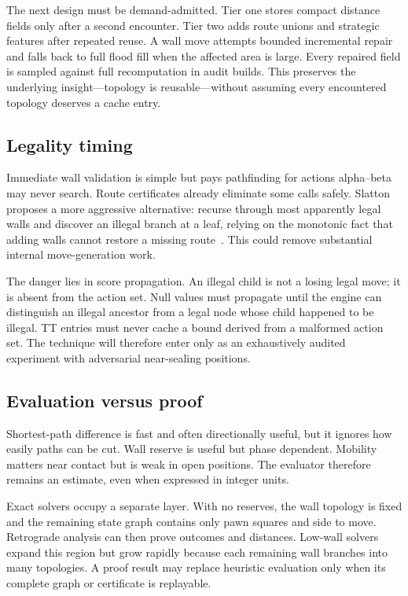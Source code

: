 The next design must be demand-admitted. Tier one stores compact distance fields only after a second encounter. Tier two adds route unions and strategic features after repeated reuse. A wall move attempts bounded incremental repair and falls back to full flood fill when the affected area is large. Every repaired field is sampled against full recomputation in audit builds. This preserves the underlying insight---topology is reusable---without assuming every encountered topology deserves a cache entry.

\subsection{Legality timing}
Immediate wall validation is simple but pays pathfinding for actions alpha--beta may never search. Route certificates already eliminate some calls safely. Slatton proposes a more aggressive alternative: recurse through most apparently legal walls and discover an illegal branch at a leaf, relying on the monotonic fact that adding walls cannot restore a missing route~\cite{slatton2026article}. This could remove substantial internal move-generation work.

The danger lies in score propagation. An illegal child is not a losing legal move; it is absent from the action set. Null values must propagate until the engine can distinguish an illegal ancestor from a legal node whose child happened to be illegal. TT entries must never cache a bound derived from a malformed action set. The technique will therefore enter only as an exhaustively audited experiment with adversarial near-sealing positions.

\subsection{Evaluation versus proof}
Shortest-path difference is fast and often directionally useful, but it ignores how easily paths can be cut. Wall reserve is useful but phase dependent. Mobility matters near contact but is weak in open positions. The evaluator therefore remains an estimate, even when expressed in integer units.

Exact solvers occupy a separate layer. With no reserves, the wall topology is fixed and the remaining state graph contains only pawn squares and side to move. Retrograde analysis can then prove outcomes and distances. Low-wall solvers expand this region but grow rapidly because each remaining wall branches into many topologies. A proof result may replace heuristic evaluation only when its complete graph or certificate is replayable.

